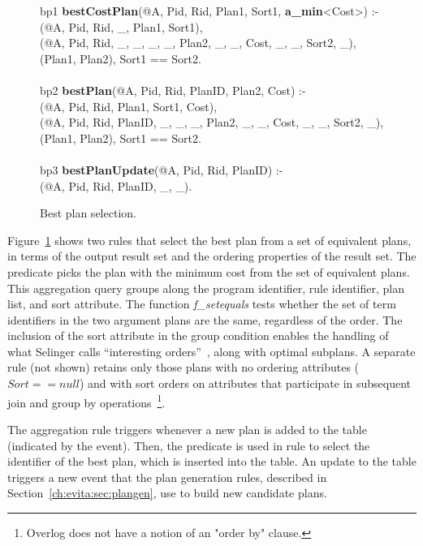 \begin{figure}
\ssp
\centering
\begin{boxedminipage}{\linewidth}
bp1 {\bf bestCostPlan}(@A, Pid, Rid, Plan1, Sort1, {\small \bf a\_min}<Cost>) :- \\
(@A, Pid, Rid, \_, Plan1, Sort1), \\
(@A, Pid, Rid, \_, \_, \_, \_, Plan2, \_, \_, Cost, \_, \_, Sort2, \_), \\
(Plan1, Plan2), Sort1 == Sort2. \\
\\            
bp2 {\bf bestPlan}(@A, Pid, Rid, PlanID, Plan2, Cost) :- \\
(@A, Pid, Rid, Plan1, Sort1, Cost), \\
(@A, Pid, Rid, PlanID, \_, \_, \_, Plan2, \_, \_, Cost, \_, \_, Sort2, \_), \\
(Plan1, Plan2), Sort1 == Sort2.\\
\\            
bp3 {\bf bestPlanUpdate}(@A, Pid, Rid, PlanID) :- \\
(@A, Pid, Rid, PlanID, \_, \_).
\end{boxedminipage}
\caption{\label{ch:evita:fig:bestplan}Best plan selection.}
\end{figure}

Figure~\ref{ch:evita:fig:bestplan} shows two rules that select the best plan from a 
set of equivalent plans, in terms of the output result set and the ordering 
properties of the result set. The  predicate picks the
plan with the minimum cost from the set of equivalent plans. This aggregation 
query groups along the program identifier, rule identifier, plan list, and sort
attribute. The function {\em f\_setequals} tests whether the set of term identifiers 
in the two argument plans are the same, regardless of the order. The inclusion of 
the sort attribute in the group condition enables the handling of what Selinger 
calls ``interesting orders''~\cite{selinger}, along with optimal subplans. A separate 
rule (not shown) retains only those plans with no ordering attributes ($Sort == null$) and 
with sort orders on attributes that participate in subsequent join and group by 
operations~\footnote{Overlog does not have a notion of an "order by" clause.}.
 
The aggregation rule  triggers whenever a new plan is added to the  
table (indicated by the  event). Then, the  predicate is used 
in rule  to select the identifier of the best plan, which is inserted into the  
table. An update to the  table triggers a new  event that the 
plan generation rules, described in Section~\ref{ch:evita:sec:plangen}, use to build new candidate plans.


